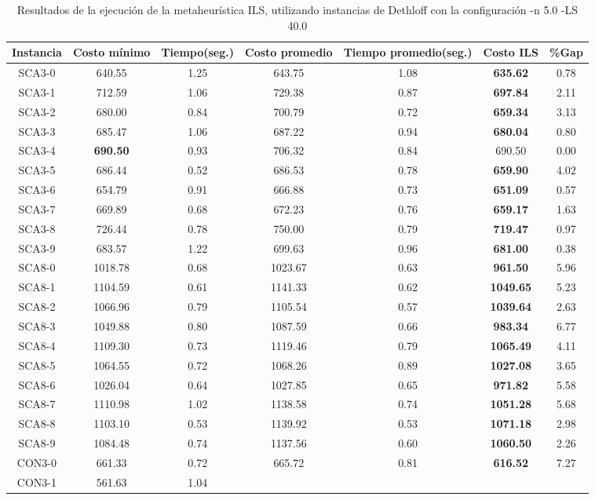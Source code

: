 \begin{table}[ht]
\caption{Resultados de la ejecución de la metaheurística ILS, utilizando instancias de Dethloff con la configuración -n 5.0 -LS 40.0}
\centering
\small
\begin{tabular}{c c c c c c c}
\hline\hline
Instancia & Costo mínimo & Tiempo(seg.) & Costo promedio & Tiempo promedio(seg.) & Costo ILS & \%Gap \\ [0.5ex]
\hline
SCA3-0 & 640.55 & 1.25 & 
643.75 & 1.08 & \bf{635.62} & 
0.78\\SCA3-1 & 712.59 & 1.06 & 
729.38 & 0.87 & \bf{697.84} & 
2.11\\SCA3-2 & 680.00 & 0.84 & 
700.79 & 0.72 & \bf{659.34} & 
3.13\\SCA3-3 & 685.47 & 1.06 & 
687.22 & 0.94 & \bf{680.04} & 
0.80\\SCA3-4 & \bf{690.50} & 0.93 & 
706.32 & 0.84 & 690.50 & 0.00\\
SCA3-5 & 686.44 & 0.52 & 
686.53 & 0.78 & \bf{659.90} & 
4.02\\SCA3-6 & 654.79 & 0.91 & 
666.88 & 0.73 & \bf{651.09} & 
0.57\\SCA3-7 & 669.89 & 0.68 & 
672.23 & 0.76 & \bf{659.17} & 
1.63\\SCA3-8 & 726.44 & 0.78 & 
750.00 & 0.79 & \bf{719.47} & 
0.97\\SCA3-9 & 683.57 & 1.22 & 
699.63 & 0.96 & \bf{681.00} & 
0.38\\SCA8-0 & 1018.78 & 0.68 & 
1023.67 & 0.63 & \bf{961.50} & 
5.96\\SCA8-1 & 1104.59 & 0.61 & 
1141.33 & 0.62 & \bf{1049.65} & 
5.23\\SCA8-2 & 1066.96 & 0.79 & 
1105.54 & 0.57 & \bf{1039.64} & 
2.63\\SCA8-3 & 1049.88 & 0.80 & 
1087.59 & 0.66 & \bf{983.34} & 
6.77\\SCA8-4 & 1109.30 & 0.73 & 
1119.46 & 0.79 & \bf{1065.49} & 
4.11\\SCA8-5 & 1064.55 & 0.72 & 
1068.26 & 0.89 & \bf{1027.08} & 
3.65\\SCA8-6 & 1026.04 & 0.64 & 
1027.85 & 0.65 & \bf{971.82} & 
5.58\\SCA8-7 & 1110.98 & 1.02 & 
1138.58 & 0.74 & \bf{1051.28} & 
5.68\\SCA8-8 & 1103.10 & 0.53 & 
1139.92 & 0.53 & \bf{1071.18} & 
2.98\\SCA8-9 & 1084.48 & 0.74 & 
1137.56 & 0.60 & \bf{1060.50} & 
2.26\\CON3-0 & 661.33 & 0.72 & 
665.72 & 0.81 & \bf{616.52} & 
7.27\\CON3-1 & 561.63 & 1.04 & 

\end{tabular}
\end{table}
